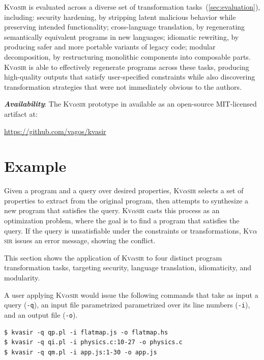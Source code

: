 \documentclass[nonacm,sigplan,review]{acmart}
\newcommand{\sys}{{\scshape Kv{$\alpha$}sir}\xspace}
\newcommand{\heading}[1]{\vspace{2pt}\noindent\textbf{\emph{#1}}:\enspace}
\newcommand{\ttt}[1]{\texttt{#1}\xspace}
\begin{document}
\sys is evaluated across a diverse set of transformation tasks~(\cref{sec:evaluation}), including:
	security hardening, by stripping latent malicious behavior while preserving intended functionality;
	cross-language translation, by regenerating semantically equivalent programs in new languages;
	idiomatic rewriting, by producing safer and more portable variants of legacy code;
	modular decomposition, by restructuring monolithic components into composable parts.
\sys is able to effectively regenerate programs across these tasks, producing high-quality outputs that satisfy user-specified constraints while also discovering transformation strategies that were not immediately obvious to the authors.

\heading{Availability}
The \sys prototype in available as an open-source MIT-licensed artifact at:
\begin{center}
  \url{https://github.com/vagos/kvasir}
\end{center}

\section{Example}
\label{sec:example}

Given a program and a query over desired properties,
\sys selects a set
of properties to extract from the original program, then attempts to synthesize
a new program that satisfies the query.
\sys casts this process as an optimization problem, where the goal is to find a
program that satisfies the query.
If the query is unsatisfiable under
the constraints or transformations, \sys issues an error
message, showing the conflict.

This section shows the application of \sys
to four distinct program transformation tasks, 
targeting security,
language translation,
idiomaticity,
and modularity.

A user applying \sys would issue the following commands that 
take as input a query (\ttt{-q}), an input file parametrized parametrized over its line numbers (\ttt{-i}), and an output file (\ttt{-o}).
\begin{verbatim}
$ kvasir -q qp.pl -i flatmap.js -o flatmap.hs
$ kvasir -q qi.pl -i physics.c:10-27 -o physics.c
$ kvasir -q qm.pl -i app.js:1-30 -o app.js
\end{verbatim}
\end{document}
